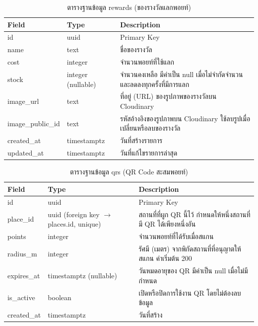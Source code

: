 \begin{table}[H]
\centering
\caption{ตารางฐานข้อมูล rewards (ของรางวัลแลกพอยท์)}
\label{tab:db_reward}
\begin{tabular}{|p{3.6cm}|p{2.6cm}|p{6.8cm}|}
\hline
\textbf{Field} & \textbf{Type} & \textbf{Description} \\
\hline
id & uuid & Primary Key \\ \hline
name & text & ชื่อของรางวัล \\ \hline
cost & integer & จำนวนพอยท์ที่ใช้แลก \\ \hline
stock & integer (nullable) & จำนวนคงเหลือ มีค่าเป็น null เมื่อไม่จำกัดจำนวน และลดลงทุกครั้งที่มีการแลก \\ \hline
image\_url & text & ที่อยู่ (URL) ของรูปภาพของรางวัลบน Cloudinary \\ \hline
image\_public\_id & text & รหัสอ้างอิงของรูปภาพบน Cloudinary ใช้ลบรูปเมื่อเปลี่ยนหรือลบของรางวัล \\ \hline
created\_at & timestamptz & วันที่สร้างรายการ \\ \hline
updated\_at & timestamptz & วันที่แก้ไขรายการล่าสุด \\
\hline
\end{tabular}
\end{table}

\begin{table}[H]
\centering
\caption{ตารางฐานข้อมูล qrs (QR Code สะสมพอยท์)}
\label{tab:db_qr}
\begin{tabular}{|p{3.6cm}|p{2.6cm}|p{6.8cm}|}
\hline
\textbf{Field} & \textbf{Type} & \textbf{Description} \\
\hline
id & uuid & Primary Key \\ \hline
place\_id & uuid (foreign key $\to$ places.id, unique) & สถานที่ที่ผูก QR นี้ไว้ กำหนดให้หนึ่งสถานที่มี QR ได้เพียงหนึ่งอัน \\ \hline
points & integer & จำนวนพอยท์ที่ได้รับเมื่อสแกน \\ \hline
radius\_m & integer & รัศมี (เมตร) จากพิกัดสถานที่ที่อนุญาตให้สแกน ค่าเริ่มต้น 200 \\ \hline
expires\_at & timestamptz (nullable) & วันหมดอายุของ QR มีค่าเป็น null เมื่อไม่มีกำหนด \\ \hline
is\_active & boolean & เปิดหรือปิดการใช้งาน QR โดยไม่ต้องลบข้อมูล \\ \hline
created\_at & timestamptz & วันที่สร้าง \\
\hline
\end{tabular}
\end{table}

